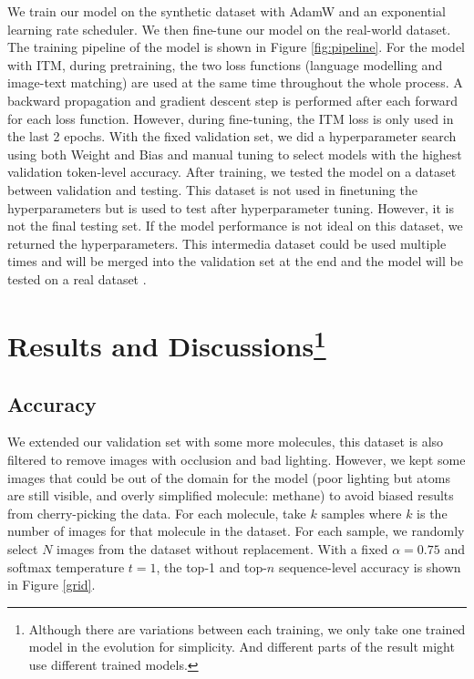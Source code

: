 \documentclass[12pt]{article}
\begin{document}
We train our model on the synthetic dataset with AdamW \autocite{adamw} and an exponential learning rate scheduler. We then fine-tune our model on the real-world dataset. The training pipeline of the model is shown in Figure \ref{fig:pipeline}. For the model with ITM, during pretraining, the two loss functions (language modelling and image-text matching) are used at the same time throughout the whole process. A backward propagation and gradient descent step is performed after each forward for each loss function. However, during fine-tuning, the ITM loss is only used in the last 2 epochs. 
With the fixed validation set, we did a hyperparameter search using both Weight and Bias \autocite{wandb} and manual tuning to select models with the highest validation token-level accuracy.  
After training, we tested the model on a dataset between validation and testing. This dataset is not used in finetuning the hyperparameters but is used to test after hyperparameter tuning. However, it is not the final testing set. If the model performance is not ideal on this dataset, we returned the hyperparameters. This intermedia dataset could be used multiple times and will be merged into the validation set at the end and the model will be tested on a real dataset
.
\section[Results and Discussions]{Results and Discussions\footnote{Although there are variations between each training, we only take one trained model in the evolution for simplicity. And different parts of the result might use different trained models. }}
\subsection{Accuracy}
We extended our validation set with some more molecules, this dataset is also filtered to remove images with occlusion and bad lighting. However, we kept some images that could be out of the domain for the model (poor lighting but atoms are still visible, and overly simplified molecule: methane) to avoid biased results from cherry-picking the data. For each molecule, take $k$ samples where $k$ is the number of images for that molecule in the dataset. For each sample, we randomly select $N$ images from the dataset without replacement. With a fixed $\alpha=0.75$ and softmax temperature $t=1$, the top-1 and top-$n$ sequence-level accuracy is shown in Figure \ref{grid}. 
\end{document}
